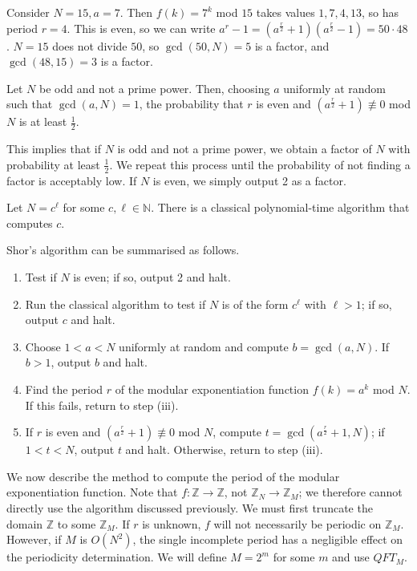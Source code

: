 Consider \( N = 15, a = 7 \).
Then \( f(k) = 7^k \) mod \( 15 \) takes values \( 1, 7, 4, 13 \), so has period \( r = 4 \).
This is even, so we can write \( a^r - 1 = (a^{\frac{r}{2}} + 1)(a^{\frac{r}{2}} - 1) = 50 \cdot 48 \).
\( N = 15 \) does not divide \( 50 \), so \( \gcd(50, N) = 5 \) is a factor, and \( \gcd(48, 15) = 3 \) is a factor.
\begin{theorem}
    Let \( N \) be odd and not a prime power.
    Then, choosing \( a \) uniformly at random such that \( \gcd(a,N) = 1 \), the probability that \( r \) is even and \( (a^{\frac{r}{2}} + 1) \not\equiv 0 \) mod \( N \) is at least \( \frac{1}{2} \).
\end{theorem}
This implies that if \( N \) is odd and not a prime power, we obtain a factor of \( N \) with probability at least \( \frac{1}{2} \).
We repeat this process until the probability of not finding a factor is acceptably low.
If \( N \) is even, we simply output 2 as a factor.
\begin{lemma}
    Let \( N = c^\ell \) for some \( c, \ell \in \mathbb N \).
    There is a classical polynomial-time algorithm that computes \( c \).
\end{lemma}
Shor's algorithm can be summarised as follows.
\begin{enumerate}
    \item Test if \( N \) is even; if so, output 2 and halt.
    \item Run the classical algorithm to test if \( N \) is of the form \( c^\ell \) with \( \ell > 1 \); if so, output \( c \) and halt.
    \item Choose \( 1 < a < N \) uniformly at random and compute \( b = \gcd(a,N) \).
    If \( b > 1 \), output \( b \) and halt.
    \item Find the period \( r \) of the modular exponentiation function \( f(k) = a^k \) mod \( N \).
    If this fails, return to step (iii).
    \item If \( r \) is even and \( (a^{\frac{r}{2}} + 1) \not\equiv 0 \) mod \( N \), compute \( t = \gcd(a^{\frac{r}{2}} + 1, N) \); if \( 1 < t < N \), output \( t \) and halt.
    Otherwise, return to step (iii).
\end{enumerate}
We now describe the method to compute the period of the modular exponentiation function.
Note that \( f \colon \mathbb Z \to \mathbb Z \), not \( \mathbb Z_N \to \mathbb Z_M \); we therefore cannot directly use the algorithm discussed previously.
We must first truncate the domain \( \mathbb Z \) to some \( \mathbb Z_M \).
If \( r \) is unknown, \( f \) will not necessarily be periodic on \( \mathbb Z_M \).
However, if \( M \) is \( O(N^2) \), the single incomplete period has a negligible effect on the periodicity determination.
We will define \( M = 2^m \) for some \( m \) and use \( QFT_M \).

